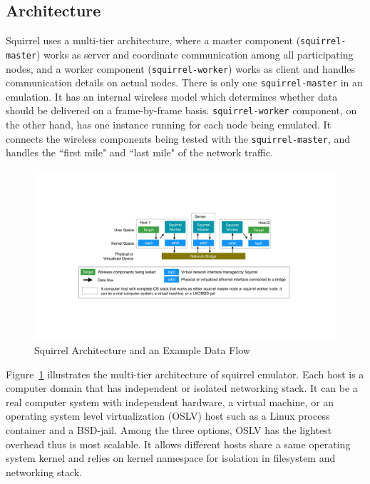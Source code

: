 \documentclass[12pt]{report}
\begin{document}
\subsection{Architecture}
Squirrel uses a multi-tier architecture, where a master component (\texttt{squirrel-master}) works as server and coordinate communication among all participating nodes, and a worker component (\texttt{squirrel-worker}) works as client and handles communication details on actual nodes. There is only one \texttt{squirrel-master} in an emulation. It has an internal wireless model which determines whether data should be delivered on a frame-by-frame basis. \texttt{squirrel-worker} component, on the other hand, has one instance running for each node being emulated. It connects the wireless components being tested with the \texttt{squirrel-master}, and handles the ``first mile" and ``last mile" of the network traffic.

\begin{figure}[h]
  \begin{center}
    \includegraphics[width=\textwidth]{figures/squirrelArch.pdf}
    \caption{\label{fig:squirrel_arch}Squirrel Architecture and an Example Data Flow}
  \end{center}
\end{figure}

Figure~\ref{fig:squirrel_arch} illustrates the multi-tier architecture of squirrel emulator. Each host is a computer domain that has independent or isolated networking stack. It can be a real computer system with independent hardware, a virtual machine, or an operating system level virtualization (OSLV) host such as a Linux process container \cite{menage2007adding} and a BSD-jail. Among the three options, OSLV has the lightest overhead thus is most scalable. It allows different hosts share a same operating system kernel and relies on kernel namespace for isolation in filesystem and networking stack.
\end{document}
